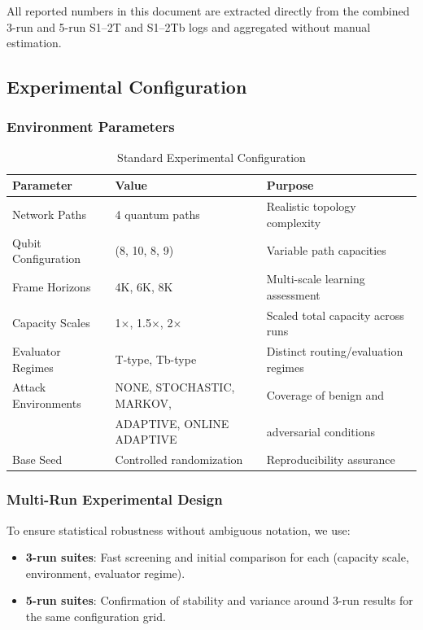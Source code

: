 \documentclass[12pt,a4paper]{article}
\begin{document}
All reported numbers in this document are extracted directly from the combined 3-run and 5-run S1–2T and S1–2Tb logs and aggregated without manual estimation.

\subsection{Experimental Configuration}

\subsubsection{Environment Parameters}

\begin{table}[H]
\centering
\caption{Standard Experimental Configuration}
\begin{tabular}{|l|l|l|}
\hline
\textbf{Parameter} & \textbf{Value} & \textbf{Purpose} \\
\hline
\hline
Network Paths & 4 quantum paths & Realistic topology complexity \\
Qubit Configuration & (8, 10, 8, 9) & Variable path capacities \\
Frame Horizons & 4K, 6K, 8K & Multi-scale learning assessment \\
Capacity Scales & 1$\times$, 1.5$\times$, 2$\times$ & Scaled total capacity across runs \\
Evaluator Regimes & T-type, Tb-type & Distinct routing/evaluation regimes \\
Attack Environments & NONE, STOCHASTIC, MARKOV, & Coverage of benign and \\
 & ADAPTIVE, ONLINE ADAPTIVE & adversarial conditions \\
Base Seed & Controlled randomization & Reproducibility assurance \\
\hline
\end{tabular}
\end{table}

\subsubsection{Multi-Run Experimental Design}

To ensure statistical robustness without ambiguous notation, we use:

\begin{itemize}
\item \textbf{3-run suites}: Fast screening and initial comparison for each (capacity scale, environment, evaluator regime).
\item \textbf{5-run suites}: Confirmation of stability and variance around 3-run results for the same configuration grid.
\end{itemize}
\end{document}
